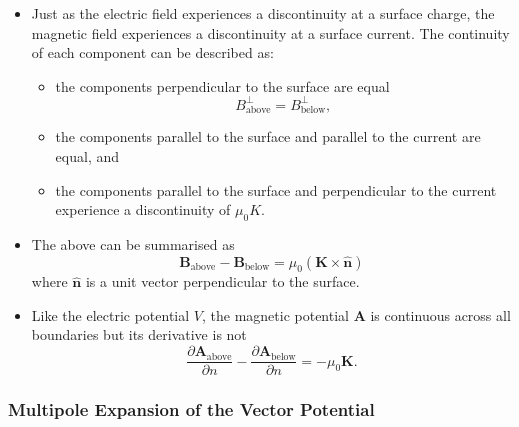 \documentclass{article}
\renewcommand{\vec}[1]{\boldsymbol{\mathbf{#1}}}
\newcommand{\uvec}[1]{\hat{\vec{#1}}}
\begin{document}
\begin{itemize}
  \item Just as the electric field experiences a discontinuity at a surface charge, the magnetic field experiences a discontinuity at a surface current. The continuity of each component can be described as:

        \begin{itemize}
          \item the components perpendicular to the surface are equal \[B_\text{above}^\perp = B_\text{below}^\perp,\]

          \item the components parallel to the surface and parallel to the current are equal, and

          \item the components parallel to the surface and perpendicular to the current experience a discontinuity of $\mu_0 K$.
        \end{itemize}

  \item The above can be summarised as \[\vec{B}_\text{above} - \vec{B}_\text{below} = \mu_0 (\vec{K} \times \uvec{n})\] where $\uvec{n}$ is a unit vector perpendicular to the surface.

  \item Like the electric potential $V$, the magnetic potential $\vec{A}$ is continuous across all boundaries but its derivative is not \[\frac{\partial \vec{A}_\text{above}}{\partial n} - \frac{\partial \vec{A}_\text{below}}{\partial n} = -\mu_0 \vec{K}.\]
\end{itemize}

\subsubsection{Multipole Expansion of the Vector Potential}
\end{document}
